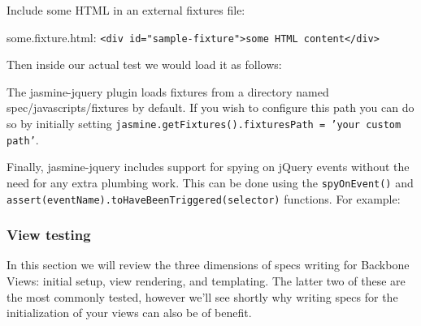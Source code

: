 \documentclass[9pt]{book}
\newenvironment{Shaded}{}{}
\newcommand{\StringTok}[1]{\textcolor[rgb]{0.25,0.44,0.63}{{#1}}}
\newcommand{\FunctionTok}[1]{\textcolor[rgb]{0.02,0.16,0.49}{{#1}}}
\newcommand{\NormalTok}[1]{{#1}}
\begin{document}
Include some HTML in an external fixtures file:

some.fixture.html:
\texttt{\textless{}div id="sample-fixture"\textgreater{}some HTML content\textless{}/div\textgreater{}}

Then inside our actual test we would load it as follows:

\begin{Shaded}
\end{Shaded}

The jasmine-jquery plugin loads fixtures from a directory named
spec/javascripts/fixtures by default. If you wish to configure this path
you can do so by initially setting
\texttt{jasmine.getFixtures().fixturesPath = 'your custom path'}.

Finally, jasmine-jquery includes support for spying on jQuery events
without the need for any extra plumbing work. This can be done using the
\texttt{spyOnEvent()} and
\texttt{assert(eventName).toHaveBeenTriggered(selector)} functions. For
example:

\begin{Shaded}
\end{Shaded}

\subsubsection{View testing}\label{view-testing}

In this section we will review the three dimensions of specs writing for
Backbone Views: initial setup, view rendering, and templating. The
latter two of these are the most commonly tested, however we'll see
shortly why writing specs for the initialization of your views can also
be of benefit.
\end{document}
